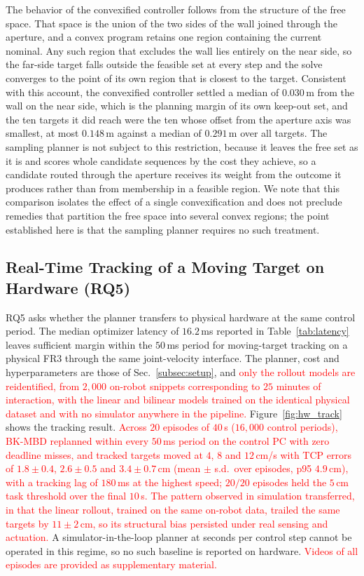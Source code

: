 \documentclass[letterpaper,10pt,conference]{ieeeconf}
\newcommand{\nd}[1]{\textcolor{red}{#1}}
\newcommand{\bkmbd}{\textsc{BK-MBD}}
\begin{document}
The behavior of the convexified controller follows from the structure of the free space.
That space is the union of the two sides of the wall joined through the aperture, and a convex program retains one region containing the current nominal.
Any such region that excludes the wall lies entirely on the near side, so the far-side target falls outside the feasible set at every step and the solve converges to the point of its own region that is closest to the target.
Consistent with this account, the convexified controller settled a median of $0.030$\,m from the wall on the near side, which is the planning margin of its own keep-out set, and the ten targets it did reach were the ten whose offset from the aperture axis was smallest, at most $0.148$\,m against a median of $0.291$\,m over all targets.
The sampling planner is not subject to this restriction, because it leaves the free set as it is and scores whole candidate sequences by the cost they achieve, so a candidate routed through the aperture receives its weight from the outcome it produces rather than from membership in a feasible region.
We note that this comparison isolates the effect of a single convexification and does not preclude remedies that partition the free space into several convex regions; the point established here is that the sampling planner requires no such treatment.


\subsection{Real-Time Tracking of a Moving Target on Hardware (RQ5)}\label{subsec:exp_hw}
RQ5 asks whether the planner transfers to physical hardware at the same control period.
The median optimizer latency of $16.2$\,ms reported in Table~\ref{tab:latency} leaves sufficient margin within the $50$\,ms period for moving-target tracking on a physical FR3 through the same joint-velocity interface.
The planner, cost and hyperparameters are those of Sec.~\ref{subsec:setup}, and \nd{only the rollout models are reidentified, from $2{,}000$ on-robot snippets corresponding to $25$ minutes of interaction, with the linear and bilinear models trained on the identical physical dataset and with no simulator anywhere in the pipeline.}
Figure~\ref{fig:hw_track} shows the tracking result.
\nd{Across $20$ episodes of $40$\,s ($16{,}000$ control periods), \bkmbd{} replanned within every $50$\,ms period on the control PC with zero deadline misses, and tracked targets moved at $4$, $8$ and $12$\,cm/s with TCP errors of $1.8 \pm 0.4$, $2.6 \pm 0.5$ and $3.4 \pm 0.7$\,cm (mean $\pm$ s.d.\ over episodes, p95 $4.9$\,cm), with a tracking lag of $180$\,ms at the highest speed; $20/20$ episodes held the $5$\,cm task threshold over the final $10$\,s.}
\nd{The pattern observed in simulation transferred, in that the linear rollout, trained on the same on-robot data, trailed the same targets by $11 \pm 2$\,cm, so its structural bias persisted under real sensing and actuation.}
A simulator-in-the-loop planner at seconds per control step cannot be operated in this regime, so no such baseline is reported on hardware.
\nd{Videos of all episodes are provided as supplementary material.}
\end{document}
